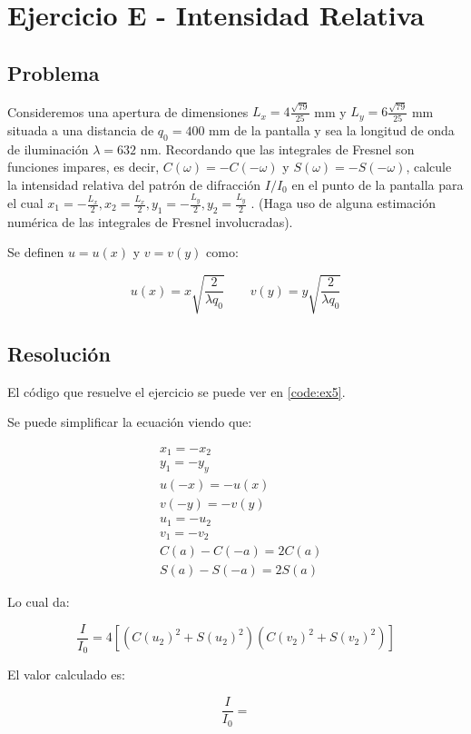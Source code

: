\section{Ejercicio E - Intensidad Relativa}

\subsection{Problema}

Consideremos una apertura de dimensiones 
$L_x = 4\frac{\sqrt{79}}{25}$ mm y $L_y = 6\frac{\sqrt{79}}{25}$ mm situada a una distancia de $q_0 = 400$ mm de la pantalla y sea la longitud de onda de iluminación $\lambda = 632$ nm. 
Recordando que las integrales de Fresnel son funciones impares, es decir, $C(\omega) = -C(-\omega)$ y $S(\omega) = -S(-\omega)$, calcule la intensidad relativa del patrón de difracción $I/I_0$ en el punto de la pantalla para el cual $x_1 = - \frac{L_x}{2}, x_2 = \frac{L_x}{2} , y_1 = -\frac{L_y}{2} , y_2 = \frac{L_y}{2}$ . (Haga uso de alguna estimación numérica de las integrales de Fresnel involucradas).

Se definen $u = u(x)$ y $v = v(y)$ como:

$$
	u(x) = x \sqrt{\frac{2}{\lambda q_0}} \ \ \ \ \ \ \ \ \ 
	v(y) = y \sqrt{\frac{2}{\lambda q_0}}
$$

\subsection{Resolución}


El código que resuelve el ejercicio se puede ver en \ref{code:ex5}. 

Se puede simplificar la ecuación viendo que:

\begin{align*}
	&x_1 = -x_2 \\
	&y_1 = -y_y \\ 
	&u(-x) = -u(x) \\
	&v(-y) = -v(y) \\ 
	&u_1 = -u_2 \\
	&v_1 = -v_2 \\
	&C(a) - C(-a) = 2C(a) \\
	&S(a) - S(-a) = 2S(a)
\end{align*}

Lo cual da:

$$
\frac{I}{I_0} = 4 [
(	C(u_2) ^2 + S(u_2)^2)
(	C(v_2) ^2 + S(v_2)^2)
]
$$

El valor calculado es: 

$$\frac{I}{I_0}  = $$

